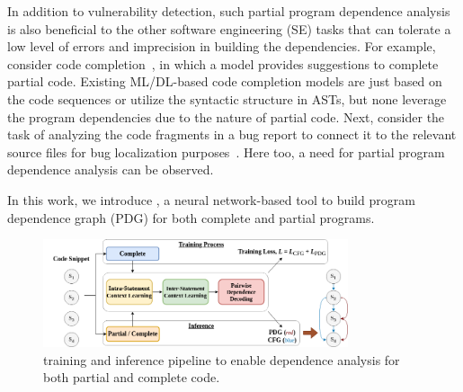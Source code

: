 In addition to vulnerability detection, such partial program dependence analysis is also beneficial to the other software engineering (SE) tasks that can tolerate a low level of errors and imprecision in building the dependencies. For example, consider code completion~\cite{codefill-icse22,facebook-icse21}, in which a model provides suggestions to complete partial code. Existing ML/DL-based code completion models are just based on the code sequences or utilize the syntactic structure in ASTs, but none leverage the program dependencies due to the nature of partial code. Next, consider the task of analyzing the code fragments in a bug report to connect it to the relevant source files for bug localization purposes~\cite{euler-fse19,icpc17}. Here too, a need for partial program dependence analysis can be observed.

In this work, we introduce \tool, a neural network-based tool to build
program dependence graph (PDG) for both complete and partial
programs. 

\begin{figure}[hbt!]
\begin{center}
    \includegraphics[width=0.8\textwidth]{icse23-demo-figures/demo-arch2.png}
    \caption{\tool training and inference pipeline to enable dependence analysis for both partial and complete code.}
    \label{fig:model}
    \vspace{-10pt}
\end{center}
\end{figure}


